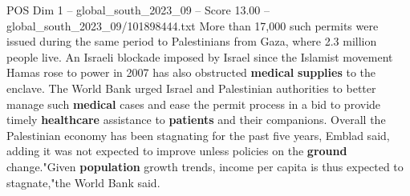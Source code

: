 \begin{textsample}{POS Dim 1 – global\_south\_2023\_09 – Score 13.00 – global\_south\_2023\_09/101898444.txt}
More than 17,000 such permits were issued during the same period to Palestinians from Gaza, where 2.3 million people live.
An Israeli blockade imposed by Israel since the Islamist movement Hamas rose to power in 2007 has also obstructed \textbf{medical} \textbf{supplies} to the enclave.
The World Bank urged Israel and Palestinian authorities to better manage such \textbf{medical} cases and ease the permit process in a bid to provide timely \textbf{healthcare} assistance to \textbf{patients} and their companions.
Overall the Palestinian economy has been stagnating for the past five years, Emblad said, adding it was not expected to improve unless policies on the \textbf{ground} change."Given \textbf{population} growth trends, income per capita is thus expected to stagnate,"the World Bank said.

\end{textsample}
